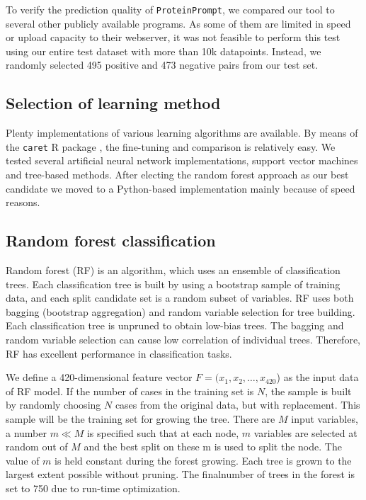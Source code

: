 \documentclass[preprint,3p,times,twocolumn]{elsarticle}
\newcommand{\tool}{\texttt{ProteinPrompt}\hspace{2pt}}
\begin{document}
To verify the prediction quality of \tool, we compared our tool to
several other publicly available programs. As some of them are limited
in speed or upload capacity to their webserver, it was not
feasible to perform this test using our entire test dataset with more
than 10k datapoints. Instead, we randomly selected 495 positive and 473
negative pairs from our test set.

\subsection{Selection of learning method}
Plenty implementations of various learning algorithms are
available. By means of the \texttt{caret} R package \cite{Kuhn:2008},
the fine-tuning and comparison is relatively easy. We tested several
artificial neural network implementations, support vector machines and
tree-based methods. After electing the random forest approach as our
best candidate we moved to a Python-based implementation mainly
because of speed reasons.  

\subsection{Random forest classification}
Random forest (RF) is an algorithm, which uses an ensemble of
classification trees. Each classification tree is built by using a
bootstrap sample of training data, and each split candidate set is a
random subset of variables. RF uses both bagging (bootstrap
aggregation) and random variable selection for tree building. Each
classification tree is unpruned to obtain low-bias trees. The bagging
and random variable selection can cause low correlation of individual
trees. Therefore, RF has excellent performance in classification
tasks. 

We define a 420-dimensional feature vector $F=(x_1,x_2,
\dots,x_{420}$) as the input data of RF model. If the number of cases
in the training set is $N$, the sample is built by randomly choosing
$N$ cases from the original data, but with replacement. This sample
will be the training set for growing the tree. There are $M$ input
variables, a number $m \ll M$ is specified such that at each node, $m$
variables are selected at random out of $M$ and the best split on
these m is used to split the node. The value of $m$ is held constant
during the forest growing. Each tree is grown to the largest extent
possible without pruning. The finalnumber of trees in the forest is
set to 750 due to run-time optimization. 
\end{document}
